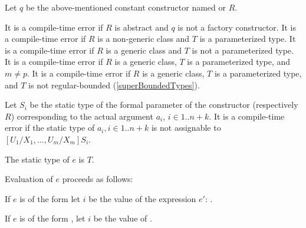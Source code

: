 \documentclass[makeidx]{article}
\begin{document}
\LMHash{}%
Let $q$ be the above-mentioned constant constructor named  or $R$.

\LMHash{}%
It is a compile-time error if $R$ is abstract
and $q$ is not a factory constructor.
It is a compile-time error if $R$ is a non-generic class
and $T$ is a parameterized type.
It is a compile-time error if $R$ is a generic class
and $T$ is not a parameterized type.
It is a compile-time error if $R$ is a generic class,
$T$ is a parameterized type, and $m \not= p$.
It is a compile-time error if $R$ is a generic class,
$T$ is a parameterized type,
and $T$ is not regular-bounded
(\ref{superBoundedTypes}).

\LMHash{}%
Let $S_i$ be the static type of
the formal parameter of the constructor  (respectively $R$)
corresponding to the actual argument $a_i$, $i \in 1 .. n+k$.
It is a compile-time error if the static type of
$a_i, i \in 1 .. n + k$
is not assignable to $[U_1/X_1, \ldots, U_m/X_m]S_i$.

\LMHash{}%
The static type of $e$ is $T$.

\LMHash{}%
Evaluation of $e$ proceeds as follows:

\LMHash{}%
If $e$ is of the form
let $i$ be the value of the expression $e'$:
.

\LMHash{}%
If $e$ is of the form
,
let $i$ be the value of
.
\end{document}

